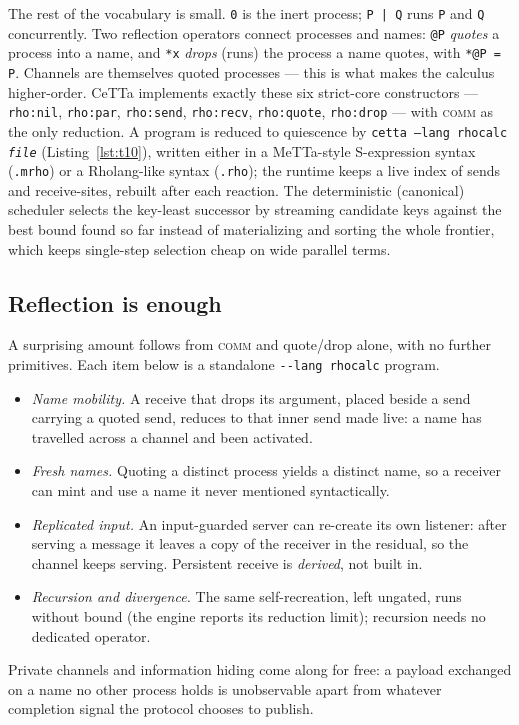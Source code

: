 \documentclass[11pt]{article}
\newcommand{\code}[1]{\texttt{#1}}
\newcommand{\CeTTa}{\textup{CeTTa}}
\begin{document}
The rest of the vocabulary is small. \code{0} is the inert process; \code{P | Q} runs
\code{P} and \code{Q} concurrently. Two reflection operators connect processes and names:
\code{@P} \emph{quotes} a process into a name, and \code{*x} \emph{drops} (runs) the process
a name quotes, with \code{*@P = P}. Channels are themselves quoted processes --- this is
what makes the calculus higher-order. \CeTTa{} implements exactly these six strict-core
constructors --- \code{rho:nil}, \code{rho:par}, \code{rho:send}, \code{rho:recv},
\code{rho:quote}, \code{rho:drop} --- with \textsc{comm} as the only reduction. A program is
reduced to quiescence by \code{cetta --lang rhocalc \textit{file}}
(Listing~\ref{lst:t10}), written either in a
MeTTa-style S-expression syntax (\code{.mrho}) or a Rholang-like syntax (\code{.rho}); the
runtime keeps a live index of sends and receive-sites, rebuilt after each reaction.  The
deterministic (canonical) scheduler selects the key-least successor by streaming candidate
keys against the best bound found so far instead of materializing and sorting the whole
frontier, which keeps single-step selection cheap on wide parallel terms.

\subsection{Reflection is enough}
\label{sec:rho-reflection}

A surprising amount follows from \textsc{comm} and quote/drop alone, with no further
primitives. Each item below is a standalone \code{-{}-lang rhocalc} program.
\begin{itemize}
\item \emph{Name mobility.} A receive that drops its argument, placed beside a send carrying
  a quoted send, reduces to that inner send made live: a name has travelled across a channel
  and been activated.
\item \emph{Fresh names.} Quoting a distinct process yields a distinct name, so a receiver
  can mint and use a name it never mentioned syntactically.
\item \emph{Replicated input.} An input-guarded server can re-create its own listener:
  after serving a message it leaves a copy of the receiver in the residual, so the channel
  keeps serving. Persistent receive is \emph{derived}, not built in.
\item \emph{Recursion and divergence.} The same self-recreation, left ungated, runs without
  bound (the engine reports its reduction limit); recursion needs no dedicated operator.
\end{itemize}
Private channels and information hiding come along for free: a payload exchanged on a name
no other process holds is unobservable apart from whatever completion signal the protocol
chooses to publish.
\end{document}
